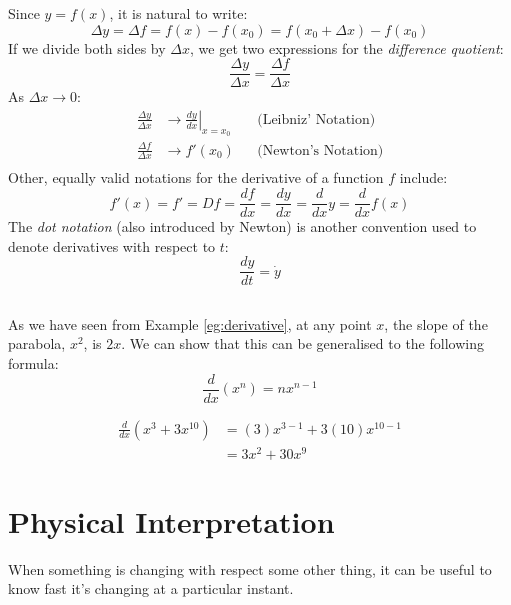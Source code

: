 \documentclass[../main.tex]{subfiles}
\begin{document}
Since $y = f(x)$, it is natural to write:
\begin{equation*}
    \Delta y = \Delta f = f(x) - f \left( x_0 \right) =
    f \left( x_0 + \Delta x \right) - f \left( x_0 \right)
\end{equation*}
If we divide both sides by $\Delta x$, we get two expressions for
the \emph{difference quotient}:
\begin{equation*}
    \frac{\Delta y}{\Delta x} = \frac{\Delta f}{\Delta x}
\end{equation*}
As $\Delta x \to 0$:
\begin{align*}
    \frac{\Delta y}{\Delta x} & \to \left. \frac{dy}{dx} \right| _{x = x_0}
    & & \textrm{(Leibniz' Notation)}\\
    \frac{\Delta f}{\Delta x} & \to f' \left( x_0 \right)
    & & \textrm{(Newton's Notation)}\\
\end{align*}
Other, equally valid notations for the derivative of a 
function $f$ include:
\begin{equation*}
    f'(x) = f'  = Df = \frac{df}{dx} = \frac{dy}{dx} = \frac{d}{dx} y
          = \frac{d}{dx} f(x)
\end{equation*}
The \emph{dot notation} (also introduced by Newton) is another convention 
used to denote derivatives with respect to $t$:
\begin{equation*}
    \frac{dy}{dt} = \dot{y}
\end{equation*}
\subsection*{}
As we have seen from Example \ref{eg:derivative}, at any point $x$, the slope of the parabola, $x^2$, 
is $2x$. 
We can show that this can be generalised to the following formula:
\begin{equation}
    \frac{d}{dx} \left( x^n \right) = nx^{n - 1}
\end{equation}

\begin{exmp}
    \begin{align*}
        \frac{d}{dx} \left( x^3 + 3x^{10} \right)
            & = (3)x^{3-1} + 3(10)x^{10-1}\\
            & = 3x^2 + 30x^9
    \end{align*}
\end{exmp}
\section{Physical Interpretation}
When something is changing with respect some other thing, 
it can be useful to know fast it’s changing at a particular instant.
\end{document}
